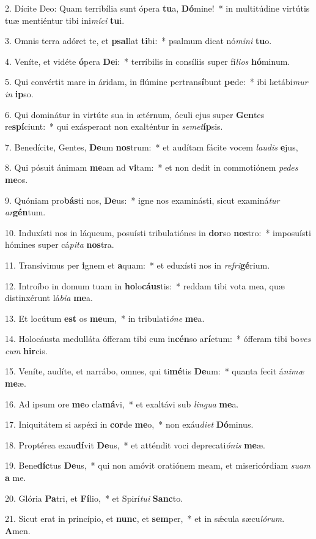 2. Dícite Deo: Quam terribília sunt ópera \textbf{tu}a, \textbf{Dó}mine!~*  in multitúdine virtútis tuæ mentiéntur tibi ini\textit{mí}\textit{ci} \textbf{tu}i.\

3. Omnis terra adóret te, et \textbf{psal}lat \textbf{ti}bi:~*  psalmum dicat nó\textit{mi}\textit{ni} \textbf{tu}o.\

4. Veníte, et vidéte \textbf{ó}pera \textbf{De}i:~*  terríbilis in consíliis super fí\textit{li}\textit{os} \textbf{hó}minum.\

5. Qui convértit mare in áridam, in flúmine pertrans\textbf{í}bunt \textbf{pe}de:~*  ibi lætábi\textit{mur} \textit{in} \textbf{ip}so.\

6. Qui dominátur in virtúte sua in ætérnum, óculi ejus super \textbf{Gen}tes re\textbf{spí}ciunt:~*  qui exásperant non exalténtur in \textit{se}\textit{met}\textbf{íp}sis.\

7. Benedícite, Gentes, \textbf{De}um \textbf{nos}trum:~*  et audítam fácite vocem \textit{lau}\textit{dis} \textbf{e}jus,\

8. Qui pósuit ánimam \textbf{me}am ad \textbf{vi}tam:~*  et non dedit in commotiónem \textit{pe}\textit{des} \textbf{me}os.\

9. Quóniam pro\textbf{bás}ti nos, \textbf{De}us:~*  igne nos examinásti, sicut examiná\textit{tur} \textit{ar}\textbf{gén}tum.\

10. Induxísti nos in láqueum, posuísti tribulatiónes in \textbf{dor}so \textbf{nos}tro:~*  imposuísti hómines super cá\textit{pi}\textit{ta} \textbf{nos}tra.\

11. Transívimus per \textbf{i}gnem et \textbf{a}quam:~*  et eduxísti nos in \textit{re}\textit{fri}\textbf{gé}rium.\

12. Introíbo in domum tuam in \textbf{ho}lo\textbf{cáus}tis:~*  reddam tibi vota mea, quæ distinxérunt lá\textit{bi}\textit{a} \textbf{me}a.\

13. Et locútum \textbf{est} os \textbf{me}um,~*  in tribulati\textit{ó}\textit{ne} \textbf{me}a.\

14. Holocáusta medulláta ófferam tibi cum in\textbf{cén}so a\textbf{rí}etum:~*  ófferam tibi bo\textit{ves} \textit{cum} \textbf{hir}cis.\

15. Veníte, audíte, et narrábo, omnes, qui ti\textbf{mé}tis \textbf{De}um:~*  quanta fecit á\textit{ni}\textit{mæ} \textbf{me}æ.\

16. Ad ipsum ore \textbf{me}o cla\textbf{má}vi,~*  et exaltávi sub \textit{lin}\textit{gua} \textbf{me}a.\

17. Iniquitátem si aspéxi in \textbf{cor}de \textbf{me}o,~*  non exáu\textit{di}\textit{et} \textbf{Dó}minus.\

18. Proptérea exau\textbf{dí}vit \textbf{De}us,~*  et atténdit voci deprecati\textit{ó}\textit{nis} \textbf{me}æ.\

19. Bene\textbf{díc}tus \textbf{De}us,~*  qui non amóvit oratiónem meam, et misericórdiam \textit{su}\textit{am} \textbf{a} me.\

20. Glória \textbf{Pa}tri, et \textbf{Fí}lio,~*  et Spirí\textit{tu}\textit{i} \textbf{Sanc}to.\

21. Sicut erat in princípio, et \textbf{nunc}, et \textbf{sem}per,~*  et in sǽcula sæcu\textit{ló}\textit{rum}. \textbf{A}men.\

